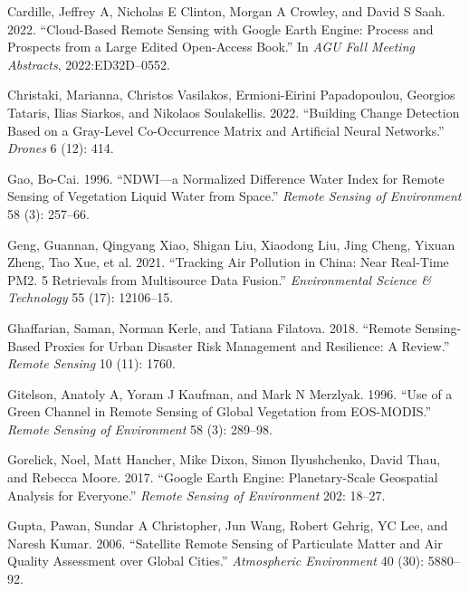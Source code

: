 \documentclass[
  letterpaper,
  DIV=11,
  numbers=noendperiod]{scrreprt}
\newlength{\cslhangindent}
\newlength{\cslentryspacingunit} %
\newenvironment{CSLReferences}[2] %
 {%
  \setlength{\parindent}{0pt}
  \ifodd #1
  \let\oldpar\par
  \def\par{\hangindent=\cslhangindent\oldpar}
  \fi
  \setlength{\parskip}{#2\cslentryspacingunit}
 }%
 {}
\begin{document}
\begin{CSLReferences}{1}{0}
\leavevmode{}%
Cardille, Jeffrey A, Nicholas E Clinton, Morgan A Crowley, and David S
Saah. 2022. {``Cloud-Based Remote Sensing with Google Earth Engine:
Process and Prospects from a Large Edited Open-Access Book.''} In
\emph{AGU Fall Meeting Abstracts}, 2022:ED32D--0552.

\leavevmode{}%
Christaki, Marianna, Christos Vasilakos, Ermioni-Eirini Papadopoulou,
Georgios Tataris, Ilias Siarkos, and Nikolaos Soulakellis. 2022.
{``Building Change Detection Based on a Gray-Level Co-Occurrence Matrix
and Artificial Neural Networks.''} \emph{Drones} 6 (12): 414.

\leavevmode{}%
Gao, Bo-Cai. 1996. {``NDWI---a Normalized Difference Water Index for
Remote Sensing of Vegetation Liquid Water from Space.''} \emph{Remote
Sensing of Environment} 58 (3): 257--66.

\leavevmode{}%
Geng, Guannan, Qingyang Xiao, Shigan Liu, Xiaodong Liu, Jing Cheng,
Yixuan Zheng, Tao Xue, et al. 2021. {``Tracking Air Pollution in China:
Near Real-Time PM2. 5 Retrievals from Multisource Data Fusion.''}
\emph{Environmental Science \& Technology} 55 (17): 12106--15.

\leavevmode{}%
Ghaffarian, Saman, Norman Kerle, and Tatiana Filatova. 2018. {``Remote
Sensing-Based Proxies for Urban Disaster Risk Management and Resilience:
A Review.''} \emph{Remote Sensing} 10 (11): 1760.

\leavevmode{}%
Gitelson, Anatoly A, Yoram J Kaufman, and Mark N Merzlyak. 1996. {``Use
of a Green Channel in Remote Sensing of Global Vegetation from
EOS-MODIS.''} \emph{Remote Sensing of Environment} 58 (3): 289--98.

\leavevmode{}%
Gorelick, Noel, Matt Hancher, Mike Dixon, Simon Ilyushchenko, David
Thau, and Rebecca Moore. 2017. {``Google Earth Engine: Planetary-Scale
Geospatial Analysis for Everyone.''} \emph{Remote Sensing of
Environment} 202: 18--27.

\leavevmode{}%
Gupta, Pawan, Sundar A Christopher, Jun Wang, Robert Gehrig, YC Lee, and
Naresh Kumar. 2006. {``Satellite Remote Sensing of Particulate Matter
and Air Quality Assessment over Global Cities.''} \emph{Atmospheric
Environment} 40 (30): 5880--92.


\end{CSLReferences}
\end{document}
